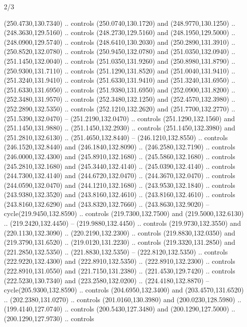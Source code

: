 \begin{flagdescription}{2/3}
\begin{scope}[xshift=0.5\flaglength,yshift=0.5\flagwidth,scale=\flagwidth/259.2]
\begin{scope}[y=0.8pt, x=0.8pt, yscale=-1,shift={(-243,-162)}]
      (250.4730,130.7340) .. controls (250.0740,130.1720) and (248.9770,130.1250) ..
      (248.3630,129.5160) .. controls (248.2730,129.5160) and (248.1950,129.5000) ..
      (248.0900,129.5740) .. controls (248.6410,130.2030) and (250.2890,131.3910) ..
      (250.8520,132.0780) .. controls (250.9450,132.0780) and (251.0350,132.0940) ..
      (251.1450,132.0040) .. controls (251.0350,131.9260) and (250.8980,131.8790) ..
      (250.9300,131.7110) .. controls (251.1290,131.8520) and (251.0040,131.9410) ..
      (251.3240,131.9410) .. controls (251.6330,131.9410) and (251.3240,131.6950) ..
      (251.6330,131.6950) .. controls (251.9380,131.6950) and (252.0900,131.8200) ..
      (252.3480,131.9570) .. controls (252.3480,132.1250) and (252.4570,132.3980) ..
      (252.2890,132.5350) .. controls (252.1210,132.2620) and (251.7700,132.2770) ..
      (251.5390,132.0470) -- (251.2190,132.0470) .. controls (251.1290,132.1560) and
      (251.1450,131.9880) .. (251.1450,132.2930) .. controls (251.1450,132.3980) and
      (251.2810,132.6130) .. (251.4650,132.8440) -- (246.1210,132.8550) .. controls
      (246.1520,132.8440) and (246.1840,132.8090) .. (246.2580,132.7190) .. controls
      (246.0000,132.4300) and (245.8910,132.1680) .. (245.5860,132.1680) .. controls
      (245.2810,132.1680) and (245.3440,132.4140) .. (245.0390,132.4140) .. controls
      (244.7300,132.4140) and (244.6720,132.0470) .. (244.3670,132.0470) .. controls
      (244.0590,132.0470) and (244.1210,132.1680) .. (243.9530,132.1840) .. controls
      (243.9380,132.3520) and (243.8160,132.4610) .. (243.8160,132.4610) .. controls
      (243.8160,132.6290) and (243.8320,132.7660) .. (243.8630,132.9020) --
      cycle(219.9450,132.8590) .. controls (219.7300,132.7500) and
      (219.5000,132.6130) .. (219.2420,132.4450) -- (219.9880,132.4450) .. controls
      (219.9730,132.3550) and (220.1130,132.3090) .. (220.2190,132.2300) .. controls
      (219.8830,132.0350) and (219.3790,131.6520) .. (219.0120,131.2230) .. controls
      (219.3320,131.2850) and (221.2850,132.5350) .. (221.8830,132.5350) --
      (222.8120,132.5350) .. controls (222.9220,132.4300) and (222.8910,132.5350) ..
      (222.8910,132.2300) .. controls (222.8910,131.0550) and (221.7150,131.2380) ..
      (221.4530,129.7420) .. controls (222.5230,130.7340) and (223.2580,132.0200) ..
      (224.4180,132.8870) -- cycle(205.9300,132.8590) .. controls
      (204.6950,132.3400) and (203.4570,131.6520) .. (202.2380,131.0270) .. controls
      (201.0160,130.3980) and (200.0230,128.5980) .. (199.4140,127.0740) .. controls
      (200.5430,127.3480) and (200.1290,127.5000) .. (200.1290,127.9730) .. controls

\end{scope}
\end{scope}
\end{flagdescription}
